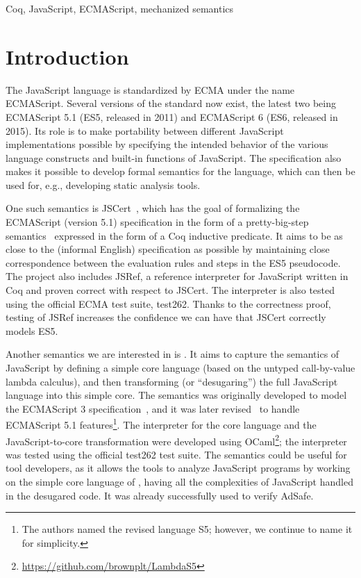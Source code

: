 \documentclass{sigplanconf}
\begin{document}

\keywords
Coq, JavaScript, ECMAScript, mechanized semantics

\section{Introduction}

The JavaScript language is standardized by ECMA under the name
ECMAScript. Several versions of the standard now exist, the latest
two being ECMAScript 5.1 (ES5, released in 2011) and ECMAScript 6
(ES6, released in 2015). Its role is to make portability between different
JavaScript implementations possible by specifying the intended behavior
of the various language constructs and built-in functions of JavaScript.
The specification also makes it possible to develop formal semantics
for the language, which can then be used for, e.g., developing
static analysis tools.

One such semantics is JSCert~\cite{Bodin-al:POPL14}, which has the
goal of formalizing the ECMAScript (version 5.1) specification in the form of
a pretty-big-step semantics~\cite{Chargueraud:ESOP13} expressed in 
the form of a Coq inductive predicate. It aims to be as close to the
(informal English) specification as possible by maintaining close correspondence
between the evaluation rules and steps in the ES5 pseudocode. The project
also includes JSRef, a reference interpreter for JavaScript written in Coq
and proven correct with respect to JSCert. The interpreter is also tested
using the official ECMA test suite, test262. Thanks to the correctness proof,
testing of JSRef increases the confidence we can have that JSCert
correctly models ES5.

Another semantics we are interested in is \lambdajs. It aims to capture
the semantics of JavaScript by defining a simple core language
(based on the untyped call-by-value lambda calculus), and then
transforming (or ``desugaring'') the full JavaScript language into this
simple core. The \lambdajs{} semantics was originally developed to model the 
ECMAScript 3 specification~\cite{Guha-al:ECOOP10}, and it was later
revised~\cite{Politz-al:DLS12} to handle ECMAScript 5.1
features\footnote{The authors named the revised language S5; however,
we continue to name it \lambdajs{} for simplicity.}.
The interpreter for the core language and the JavaScript-to-core
transformation were developed using 
OCaml\footnote{\url{https://github.com/brownplt/LambdaS5}};
the interpreter was tested using the official test262 test suite.
The \lambdajs{} semantics could be useful for tool developers, as it
allows the tools to analyze JavaScript programs by working
on the simple core language of \lambdajs, having all the complexities
of JavaScript handled in the desugared code. It was already
successfully used to verify AdSafe. %
\end{document}
